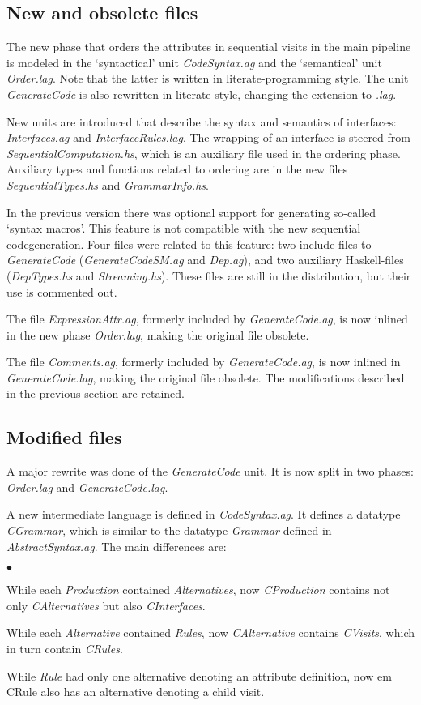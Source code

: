 \documentclass[twoside]{article}
\newenvironment{itize}{\begin{list}{$\bullet$}{\parsep=0pt\parskip=0pt\topsep=0pt\itemsep=0pt}}{\end{list}}
\begin{document}
\subsection{New and obsolete files}

The new phase that orders the attributes in sequential visits in the main pipeline 
is modeled in the `syntactical' unit {\em CodeSyntax.ag}
and the `semantical' unit {\em Order.lag}. Note that the latter is 
written in literate-programming style.
The unit {\em GenerateCode} is also rewritten in literate style, 
changing the extension to {\em .lag}.

New units are introduced that describe the syntax and semantics of interfaces:
{\em Interfaces.ag} and {\em InterfaceRules.lag}.
The wrapping of an interface is steered from {\em SequentialComputation.hs},
which is an auxiliary file used in the ordering phase.
Auxiliary types and functions related to ordering are in the new files
{\em SequentialTypes.hs} and {\em GrammarInfo.hs}.

In the previous version there was optional support for generating so-called `syntax macros'.
This feature is not compatible with the new sequential codegeneration.
Four files were related to this feature:
two include-files to {\em GenerateCode} ({\em GenerateCodeSM.ag} and {\em Dep.ag}),
and two auxiliary Haskell-files ({\em DepTypes.hs} and {\em Streaming.hs}).
These files are still in the distribution, but their use is commented out.

The file {\em ExpressionAttr.ag}, formerly included by {\em GenerateCode.ag},
is now inlined in the new phase {\em Order.lag}, making the original file obsolete.

The file {\em Comments.ag}, formerly included by {\em GenerateCode.ag},
is now inlined in {\em GenerateCode.lag}, making the original file obsolete.
The modifications described in the previous section are retained.



\subsection{Modified files}

A major rewrite was done of the {\em GenerateCode} unit.
It is now split in two phases: {\em Order.lag} and {\em GenerateCode.lag}.

A new intermediate language is defined in {\em CodeSyntax.ag}.
It defines a datatype {\em CGrammar}, which is similar to the
datatype {\em Grammar} defined in {\em AbstractSyntax.ag}.
The main differences are:
\begin{itize}
\item While each {\em Production} contained {\em Alternatives},
      now {\em CProduction} contains not only {\em CAlternatives} but also {\em CInterfaces}.
\item While each {\em Alternative} contained {\em Rules},
      now {\em CAlternative} contains {\em CVisits}, which in turn contain {\em CRules}.
\item While {\em Rule} had only one alternative denoting an attribute definition,
      now {em CRule} also has an alternative denoting a child visit.
\end{itize}
\end{document}
